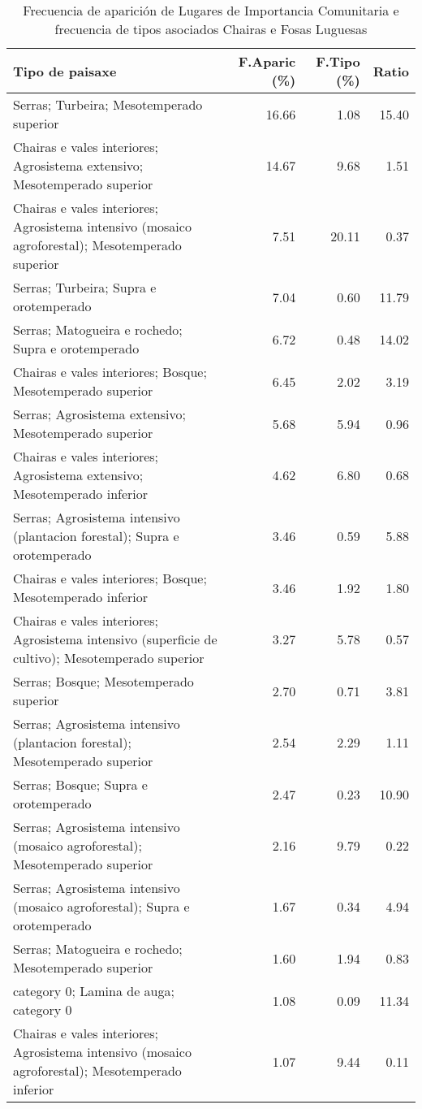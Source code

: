 \begin{table}[p]
\centering
\caption{Frecuencia de aparición de Lugares de Importancia Comunitaria e frecuencia de tipos asociados Chairas e Fosas Luguesas} 
\label{vnatura6}
\begin{tabular}{lrrr}
  \hline
Tipo de paisaxe & F.Aparic (\%) & F.Tipo (\%) & Ratio \\ 
  \hline
Serras; Turbeira; Mesotemperado superior & 16.66 & 1.08 & 15.40 \\ 
  Chairas e vales interiores; Agrosistema extensivo; Mesotemperado superior & 14.67 & 9.68 & 1.51 \\ 
  Chairas e vales interiores; Agrosistema intensivo (mosaico agroforestal); Mesotemperado superior & 7.51 & 20.11 & 0.37 \\ 
  Serras; Turbeira; Supra e orotemperado & 7.04 & 0.60 & 11.79 \\ 
  Serras; Matogueira e rochedo; Supra e orotemperado & 6.72 & 0.48 & 14.02 \\ 
  Chairas e vales interiores; Bosque; Mesotemperado superior & 6.45 & 2.02 & 3.19 \\ 
  Serras; Agrosistema extensivo; Mesotemperado superior & 5.68 & 5.94 & 0.96 \\ 
  Chairas e vales interiores; Agrosistema extensivo; Mesotemperado inferior & 4.62 & 6.80 & 0.68 \\ 
  Serras; Agrosistema intensivo (plantacion forestal); Supra e orotemperado & 3.46 & 0.59 & 5.88 \\ 
  Chairas e vales interiores; Bosque; Mesotemperado inferior & 3.46 & 1.92 & 1.80 \\ 
  Chairas e vales interiores; Agrosistema intensivo (superficie de cultivo); Mesotemperado superior & 3.27 & 5.78 & 0.57 \\ 
  Serras; Bosque; Mesotemperado superior & 2.70 & 0.71 & 3.81 \\ 
  Serras; Agrosistema intensivo (plantacion forestal); Mesotemperado superior & 2.54 & 2.29 & 1.11 \\ 
  Serras; Bosque; Supra e orotemperado & 2.47 & 0.23 & 10.90 \\ 
  Serras; Agrosistema intensivo (mosaico agroforestal); Mesotemperado superior & 2.16 & 9.79 & 0.22 \\ 
  Serras; Agrosistema intensivo (mosaico agroforestal); Supra e orotemperado & 1.67 & 0.34 & 4.94 \\ 
  Serras; Matogueira e rochedo; Mesotemperado superior & 1.60 & 1.94 & 0.83 \\ 
  category 0; Lamina de auga; category 0 & 1.08 & 0.09 & 11.34 \\ 
  Chairas e vales interiores; Agrosistema intensivo (mosaico agroforestal); Mesotemperado inferior & 1.07 & 9.44 & 0.11 \\ 
   \hline
\end{tabular}
\end{table}
